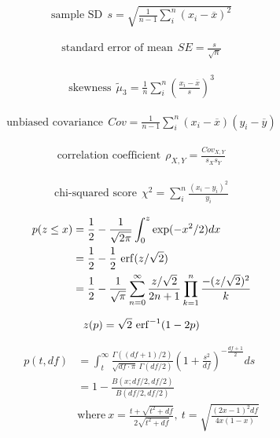 \begin{align*} 
    \text{sample SD}~~s = \sqrt{\frac{1}{n-1}\sum_i^{n}(x_i-\overline{x})^2}
\end{align*}

\begin{align*} 
    \text{standard error of mean}~~SE = \frac{s}{\sqrt{n}}
\end{align*}

\begin{align*} 
    \text{skewness}~~\tilde{\mu}_3 = \frac{1}{n}\sum_i^{n}\left(\frac{x_i-\overline{x}}{s}\right)^3
\end{align*}

\begin{align*} 
    \text{unbiased covariance}~~Cov = \frac{1}{n-1}\sum_i^{n}(x_i-\overline{x})(y_i-\overline{y})
\end{align*}

\begin{align*} 
    \text{correlation coefficient}~~\rho_{X,Y} = \frac{Cov_{X,Y}}{s_{X}s_{Y}}
\end{align*}

\begin{align*} 
    \text{chi-squared score}~~\chi^2 = \sum_i^{n}\frac{(x_i-y_i)^2}{y_i}
\end{align*}

\begin{align*} 
    p(z \leq x) &= \frac{1}{2} - \frac{1}{\sqrt{2\pi}}\int_{0}^{z}\exp(-x^2/2)dx \\
    &= \frac{1}{2}-\frac{1}{2}~{\rm erf}(z/\sqrt{2}) \\
    &= \frac{1}{2}-\frac{1}{\sqrt{\pi}}\sum_{n=0}^{\infty}\frac{z/\sqrt{2}}{2n+1}\prod_{k=1}^{n}\frac{-(z/\sqrt{2})^2}{k}
\end{align*}

\begin{align*} 
    z(p) = \sqrt{2}~{\rm erf}^{-1}(1-2p)
\end{align*}

\begin{align*} 
    p(t,df) &= \int_t^{\infty}\frac{\Gamma((df+1)/2)}{\sqrt{df\cdot\pi}~\Gamma(df/2)}\left(1+\frac{s^2}{df}\right)^{-\frac{df+1}{2}}ds\\
    &= 1-\frac{B(x;df/2,df/2)}{B(df/2,df/2)} \\
    &\text{where}~x =\frac{t+\sqrt{t^2+df}}{2\sqrt{t^2+df}},~t=\sqrt{\frac{(2x-1)^2df}{4x(1-x)}}
\end{align*}

